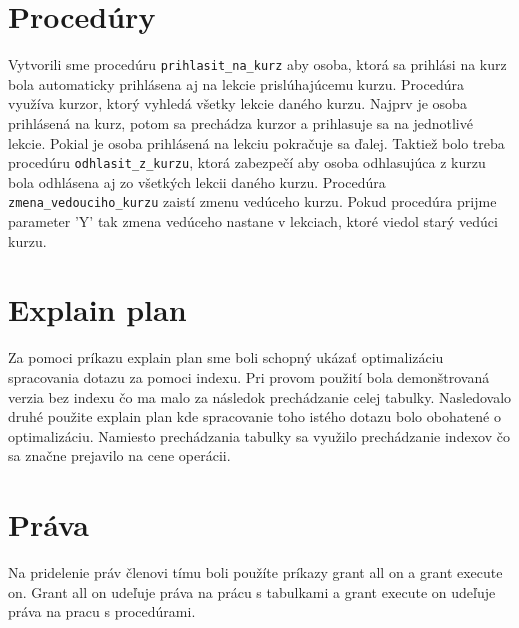 \documentclass[11pt]{article}
\begin{document}
\section{Procedúry}
Vytvorili sme procedúru \texttt{prihlasit\_na\_kurz} aby osoba, ktorá sa prihlási na kurz bola automaticky
prihlásena aj na lekcie prislúhajúcemu kurzu. Procedúra využíva kurzor, ktorý vyhledá všetky lekcie daného kurzu. Najprv je osoba prihlásená na kurz, potom sa prechádza kurzor a prihlasuje sa na jednotlivé lekcie. Pokial je osoba prihlásená na lekciu pokračuje sa ďalej. Taktiež bolo treba procedúru \texttt{odhlasit\_z\_kurzu}, ktorá zabezpečí aby osoba odhlasujúca z kurzu bola odhlásena aj zo všetkých lekcii daného kurzu. 
Procedúra \texttt{zmena\_vedouciho\_kurzu} zaistí zmenu vedúceho kurzu. Pokud procedúra prijme parameter 'Y' tak zmena vedúceho nastane v lekciach, ktoré viedol starý vedúci kurzu.

\section{Explain plan}
Za pomoci príkazu explain plan sme boli schopný ukázať optimalizáciu spracovania dotazu za pomoci indexu.
Pri provom použití bola demonštrovaná verzia bez indexu čo ma malo za následok prechádzanie celej tabulky.
Nasledovalo druhé použite explain plan kde spracovanie toho istého dotazu bolo obohatené o optimalizáciu.
Namiesto prechádzania tabulky sa využilo prechádzanie  indexov čo sa značne prejavilo na cene operácii.

\section{Práva}
Na pridelenie práv členovi tímu boli použíte príkazy grant all on a grant execute on.
Grant all on udeľuje práva na prácu s tabulkami a grant execute on udeľuje práva na pracu s procedúrami.
\end{document}
